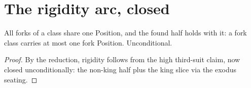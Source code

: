 \section{The rigidity arc, closed}

\begin{theorem}\label{thm:forkPositionTarget}
\leanok
{}
All forks of a class share one Position, and the found half holds
with it: a fork class carries at most one fork Position.
Unconditional.
\end{theorem}

\begin{proof}
\leanok
{}
By the reduction, rigidity follows from the high third-suit
claim, now closed unconditionally: the non-king half plus the
king slice via the exodus seating.
\end{proof}
